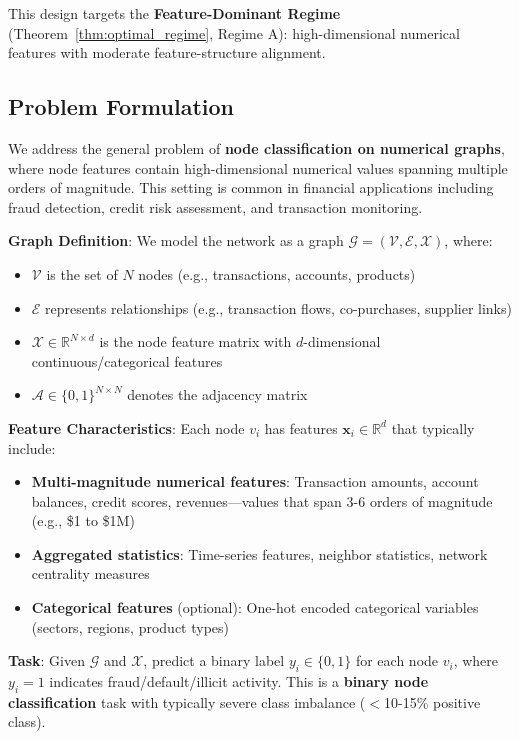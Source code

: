 This design targets the \textbf{Feature-Dominant Regime} (Theorem~\ref{thm:optimal_regime}, Regime A): high-dimensional numerical features with moderate feature-structure alignment.

\subsection{Problem Formulation}

We address the general problem of \textbf{node classification on numerical graphs}, where node features contain high-dimensional numerical values spanning multiple orders of magnitude. This setting is common in financial applications including fraud detection, credit risk assessment, and transaction monitoring.

\textbf{Graph Definition}: We model the network as a graph $\mathcal{G} = (\mathcal{V}, \mathcal{E}, \mathcal{X})$, where:
\begin{itemize}
\item $\mathcal{V}$ is the set of $N$ nodes (e.g., transactions, accounts, products)
\item $\mathcal{E}$ represents relationships (e.g., transaction flows, co-purchases, supplier links)
\item $\mathcal{X} \in \mathbb{R}^{N \times d}$ is the node feature matrix with $d$-dimensional continuous/categorical features
\item $\mathcal{A} \in \{0,1\}^{N \times N}$ denotes the adjacency matrix
\end{itemize}

\textbf{Feature Characteristics}: Each node $v_i$ has features $\mathbf{x}_i \in \mathbb{R}^{d}$ that typically include:
\begin{itemize}
\item \textbf{Multi-magnitude numerical features}: Transaction amounts, account balances, credit scores, revenues---values that span 3-6 orders of magnitude (e.g., \$1 to \$1M)
\item \textbf{Aggregated statistics}: Time-series features, neighbor statistics, network centrality measures
\item \textbf{Categorical features} (optional): One-hot encoded categorical variables (sectors, regions, product types)
\end{itemize}

\textbf{Task}: Given $\mathcal{G}$ and $\mathcal{X}$, predict a binary label $y_i \in \{0, 1\}$ for each node $v_i$, where $y_i=1$ indicates fraud/default/illicit activity. This is a \textbf{binary node classification} task with typically severe class imbalance ($<$10-15\% positive class).

